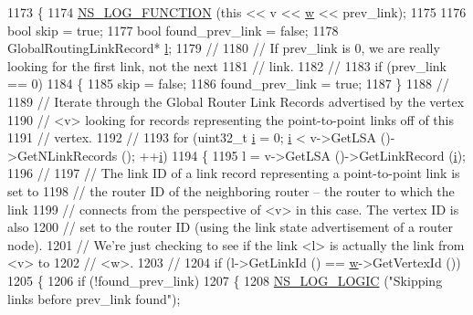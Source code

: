 \begin{DoxyCode}
1173 \{
1174   \hyperlink{log-macros-disabled_8h_a90b90d5bad1f39cb1b64923ea94c0761}{NS\_LOG\_FUNCTION} (\textcolor{keyword}{this} << v << \hyperlink{lte_2model_2fading-traces_2fading__trace__generator_8m_afd61ec66f9d7b807eece6eb12c781844}{w} << prev\_link);
1175 
1176   \textcolor{keywordtype}{bool} skip = \textcolor{keyword}{true};
1177   \textcolor{keywordtype}{bool} found\_prev\_link = \textcolor{keyword}{false};
1178   GlobalRoutingLinkRecord* \hyperlink{buildings__pathloss_8m_a5b54c0a045f179bcbbbc9abcb8b5cd4c}{l};
1179 \textcolor{comment}{//}
1180 \textcolor{comment}{// If prev\_link is 0, we are really looking for the first link, not the next }
1181 \textcolor{comment}{// link.}
1182 \textcolor{comment}{//}
1183   \textcolor{keywordflow}{if} (prev\_link == 0)
1184     \{
1185       skip = \textcolor{keyword}{false};
1186       found\_prev\_link = \textcolor{keyword}{true};
1187     \}
1188 \textcolor{comment}{//}
1189 \textcolor{comment}{// Iterate through the Global Router Link Records advertised by the vertex}
1190 \textcolor{comment}{// <v> looking for records representing the point-to-point links off of this}
1191 \textcolor{comment}{// vertex.}
1192 \textcolor{comment}{//}
1193   \textcolor{keywordflow}{for} (uint32\_t \hyperlink{bernuolliDistribution_8m_a6f6ccfcf58b31cb6412107d9d5281426}{i} = 0; \hyperlink{bernuolliDistribution_8m_a6f6ccfcf58b31cb6412107d9d5281426}{i} < v->GetLSA ()->GetNLinkRecords (); ++\hyperlink{bernuolliDistribution_8m_a6f6ccfcf58b31cb6412107d9d5281426}{i})
1194     \{
1195       l = v->GetLSA ()->GetLinkRecord (\hyperlink{bernuolliDistribution_8m_a6f6ccfcf58b31cb6412107d9d5281426}{i});
1196 \textcolor{comment}{//}
1197 \textcolor{comment}{// The link ID of a link record representing a point-to-point link is set to}
1198 \textcolor{comment}{// the router ID of the neighboring router -- the router to which the link}
1199 \textcolor{comment}{// connects from the perspective of <v> in this case.  The vertex ID is also}
1200 \textcolor{comment}{// set to the router ID (using the link state advertisement of a router node).}
1201 \textcolor{comment}{// We're just checking to see if the link <l> is actually the link from <v> to}
1202 \textcolor{comment}{// <w>.}
1203 \textcolor{comment}{//}
1204       \textcolor{keywordflow}{if} (l->GetLinkId () == \hyperlink{lte_2model_2fading-traces_2fading__trace__generator_8m_afd61ec66f9d7b807eece6eb12c781844}{w}->GetVertexId ()) 
1205         \{
1206           \textcolor{keywordflow}{if} (!found\_prev\_link)
1207             \{
1208               \hyperlink{group__logging_ga88acd260151caf2db9c0fc84997f45ce}{NS\_LOG\_LOGIC} (\textcolor{stringliteral}{"Skipping links before prev\_link found"});

\end{DoxyCode}
